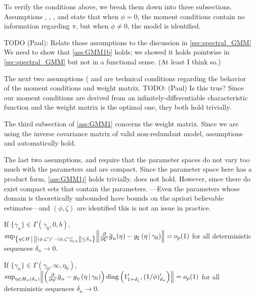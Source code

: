 \documentclass[11pt]{article}
\newcommand{\orange}[1]{\textcolor{OrangeRed1}{#1}}
\newcommand*{\Eta}{H}
\newcommand*{\popmom}{\ensuremath{g}}
\newcommand*{\sampmom}{\ensuremath{\overline{g}_n}}
\DeclarePairedDelimiter\norm{\lVert}{\rVert}
\DeclareMathOperator{\diag}{diag}
\newcommand{\mvert}[1][\middle]{\ensuremath{\,#1\vert\,}}
\begin{document}
To verify the conditions above, we break them down into three subsections.
Assumptions , , , and 
state that when $\phi = 0$, the moment conditions contain no information regarding $\pi$, but when $\phi \neq 0$,
the model is identified.

\orange{TODO (Paul):} 
Relate those assumptions to the discussion in \cref{sec:spectral_GMM}
We need to show that \cref{ass:GMM1b} holds; we showed it holds pointwise in \cref{sec:spectral_GMM} but not in a
functional sense. (At least I think so.)

The next two assumptions ( and  are  technical conditions regarding the
behavior of the moment conditions and weight matrix. 
\orange{TODO: (Paul) Is this true?} 
Since our moment conditions are derived from an infinitely-differentiable  characteristic function and the weight
matrix is the optimal one, they both hold trivially.

The third subsection of \cref{ass:GMM1} concerns the weight matrix.
Since we are using the inverse covariance matrix of valid non-redundant model, assumptions 
and  automatically hold.

The last two assumptions,  and  require that the parameter spaces do not
vary too much with the parameters and are compact.
Since the parameter space here has a product form, \cref{ass:GMM1j}  holds trivially.
 does not hold.
However, since there do exist compact sets that contain the parameters. 
---Even the parameters whose domain is theoretically unbounded have bounds on the apriori believable
estimates---and $(\phi, \zeta)$ are identified this is not an issue in practice. 



\begin{assump}[GMM 2*]\label{ass:GMM2}
\begin{assumplist}
    \item If $\{\gamma_n\} \in \Gamma\left(\gamma_0, 0, b\right)$, \newline $\sup_{\left\lbrace \eta \in \Eta
        \mvert \norm*{(\phi, \zeta')' - (\phi, \zeta')_{0,n}'} \leq \delta_n \right\rbrace}
        \norm*{\frac{\partial}{\partial \xi'} \sampmom(\eta) - \popmom_{\xi}\left(\eta \mvert \gamma_0 \right)} =
        o_p(1)$  for all deterministic sequences  $\delta_n \to 0$.
    \item If $\{\gamma_n \} \in \Gamma\left(\gamma_0, \infty, \eta_0\right)$, $\sup_{\eta \in \Eta_{n}(\delta_n)}
        \norm*{\left(\frac{\partial}{\partial \eta'} \overline{g}_n - g_{\eta}\left(\eta \mvert
        \gamma_0\right)\right) \diag\left(1_{1+d_\zeta}', (1/\phi)_{d_{\pi}}'\right)}  = o_p(1)$ for all
        deterministic sequences $\delta_n \to 0$.
\end{assumplist}
\end{assump}
\end{document}
